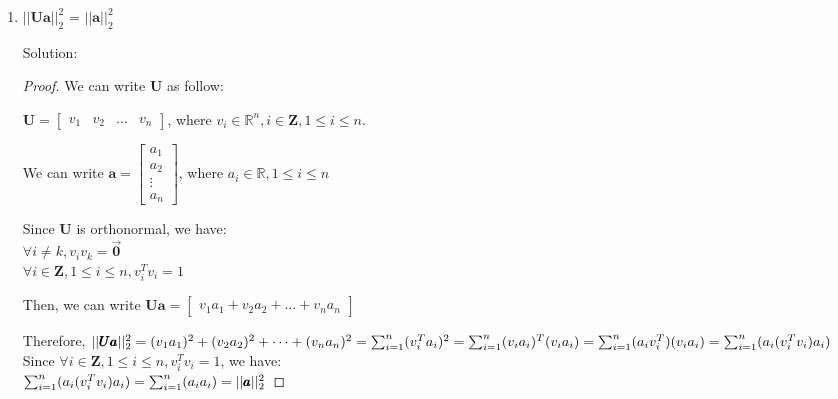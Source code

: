 \documentclass[12pt]{article}
\newcommand{\solu}{{\color{blue} Solution:}}
\newcommand{\Rbb}{\mathbb{R}}
\newcommand{\Z}{\mathbf{Z}}
\newcommand{\Upmb}{\pmb{U}}
\begin{document}
\begin{enumerate}
\begin{enumerate}
\begin{proof}
                        Therefore, trace($\pmb{a}\pmb{a}^T$) = $a_1 \cdot a_1 + a_2 \cdot a_2 + \cdots + a_n \cdot a_n$ = $\sum_{i = 1}^{n} a_i^2$ = $||\pmb{a}||^2_2$

                        Thus, trace($\pmb{a}\pmb{a}^T$) = $||\pmb{a}||^2_2$
                    \end{proof}

              \item $||\Upmb \pmb{a}||_2^2$ = $||\pmb{a}||_2^2$

                    \solu
                    \begin{proof}

                        We can write $\Upmb$ as follow:

                        $
                            \Upmb =
                            \begin{bmatrix}
                                v_1 & v_2 & \dots & v_n
                            \end{bmatrix}
                        $, where $v_i \in \Rbb^n, i\in \Z, 1 \le i \le n$.

                        We can write $\pmb{a} = \begin{bmatrix}
                            a_1 \\ a_2 \\ \vdots \\ a_n
                        \end{bmatrix}$, where $a_i \in \Rbb, 1 \le i \le n$

                        Since $\Upmb$ is orthonormal, we have:\\
                        $\forall i \ne k, v_iv_k = \overrightarrow{\pmb{0}}$\\
                        $\forall i\in \Z, 1 \le i \le n, v_i^T v_i = 1$

                        Then, we can write $\Upmb\pmb{a} =
                            \begin{bmatrix}
                                v_1a_1 + v_2a_2 + \dots + v_na_n
                            \end{bmatrix}$

                        Therefore, $||\Upmb\pmb{a}||^2_2 = (v_1a_1)^2 + (v_2a_2)^2 + \dots + (v_na_n)^2 \\
                            = \sum_{i = 1}^n (v_i^Ta_i)^2 \\
                            = \sum_{i = 1}^n (v_ia_i)^T(v_ia_i) \\
                            = \sum_{i = 1}^n (a_iv_i^T)(v_ia_i) \\
                            = \sum_{i = 1}^n (a_i(v_i^Tv_i)a_i)$ \\
                        Since $\forall i\in \Z, 1 \le i \le n, v_i^T v_i = 1$, we have:\\
                        $\sum_{i = 1}^n (a_i(v_i^Tv_i)a_i) \\
                        = \sum_{i = 1}^n (a_ia_i) \\
                        = ||\pmb{a}||^2_2$


\end{proof}
\end{enumerate}
\end{enumerate}
\end{document}
